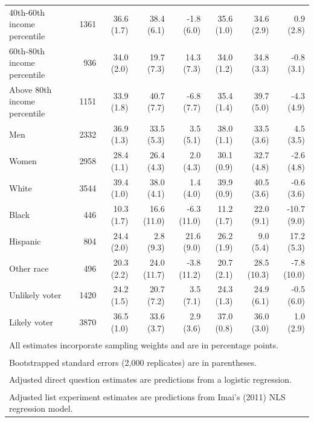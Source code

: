 \begin{table}[!h]
{\begin{tabular}[t]{lrrrrrrr}
40th-60th income percentile & 1361 & 36.6 (1.7) & 38.4 (6.1) & -1.8 (6.0) & 35.6 (1.0) & 34.6 (2.9) & 0.9 (2.8)\\
\addlinespace
60th-80th income percentile & 936 & 34.0 (2.0) & 19.7 (7.3) & 14.3 (7.3) & 34.0 (1.2) & 34.8 (3.3) & -0.8 (3.1)\\
Above 80th income percentile & 1151 & 33.9 (1.8) & 40.7 (7.7) & -6.8 (7.7) & 35.4 (1.4) & 39.7 (5.0) & -4.3 (4.9)\\
\midrule
Men & 2332 & 36.9 (1.3) & 33.5 (5.3) & 3.5 (5.1) & 38.0 (1.1) & 33.5 (3.6) & 4.5 (3.5)\\
Women & 2958 & 28.4 (1.1) & 26.4 (4.3) & 2.0 (4.3) & 30.1 (0.9) & 32.7 (4.8) & -2.6 (4.8)\\
\midrule
White & 3544 & 39.4 (1.0) & 38.0 (4.1) & 1.4 (4.0) & 39.9 (0.9) & 40.5 (3.6) & -0.6 (3.6)\\
\addlinespace
Black & 446 & 10.3 (1.7) & 16.6 (11.0) & -6.3 (11.0) & 11.2 (1.7) & 22.0 (9.1) & -10.7 (9.0)\\
Hispanic & 804 & 24.4 (2.0) & 2.8 (9.3) & 21.6 (9.0) & 26.2 (1.9) & 9.0 (5.4) & 17.2 (5.3)\\
Other race & 496 & 20.3 (2.2) & 24.0 (11.7) & -3.8 (11.2) & 20.7 (2.1) & 28.5 (10.3) & -7.8 (10.0)\\
\midrule
Unlikely voter & 1420 & 24.2 (1.5) & 20.7 (7.2) & 3.5 (7.1) & 24.3 (1.3) & 24.9 (6.1) & -0.5 (6.0)\\
Likely voter & 3870 & 36.5 (1.0) & 33.6 (3.7) & 2.9 (3.6) & 37.0 (0.8) & 36.0 (3.0) & 1.0 (2.9)\\
\bottomrule
\multicolumn{8}{l}{\textsuperscript{} All estimates incorporate sampling weights and are in percentage points.}\\
\multicolumn{8}{l}{\textsuperscript{} Bootstrapped standard errors (2,000 replicates) are in parentheses.}\\
\multicolumn{8}{l}{\textsuperscript{} Adjusted direct question estimates are predictions from a logistic regression.}\\
\multicolumn{8}{l}{\textsuperscript{} Adjusted list experiment estimates are predictions from Imai's (2011) NLS regression model.}\\
\end{tabular}}
\end{table}
